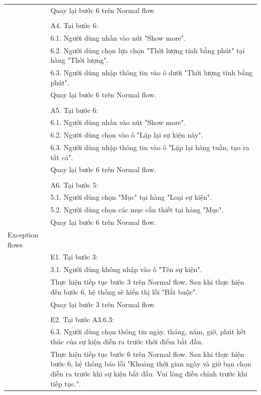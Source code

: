 \documentclass[a4paper, 12pt]{article}
\begin{document}
\begin{table}[H]
\begin{tabular}{|l|p{11cm}|}
        & Quay lại bước 6 trên Normal flow. \\
        & \\
        & A4. Tại bước 6: \\
        & 6.1. Người dùng nhấn vào nút "Show more". \\
        & 6.2. Người dùng chọn lựa chọn "Thời lượng tính bằng phút" tại hàng "Thời lượng". \\
        & 6.3. Người dùng nhập thông tin vào ô dưới "Thời lượng tính bằng phút". \\
        & Quay lại bước 6 trên Normal flow. \\
        & \\
        & A5. Tại bước 6: \\
        & 6.1. Người dùng nhấn vào nút "Show more". \\
        & 6.2. Người dùng chọn vào ô "Lặp lại sự kiện này". \\
        & 6.3. Người dùng nhập thông tin vào ô "Lặp lại hàng tuần, tạo ra tất cả". \\
        & Quay lại bước 6 trên Normal flow. \\
        & \\
        & A6. Tại bước 5: \\
        & 5.1. Người dùng chọn "Mục" tại hàng "Loại sự kiện". \\
        & 5.2. Người dùng chọn các mục cần thiết tại hàng "Mục". \\
        & Quay lại bước 6 trên Normal flow. \\
        \hline
        Exception flows & \\
        & E1. Tại bước 3: \\
        & 3.1. Người dùng không nhập vào ô "Tên sự kiện". \\
        & Thực hiện tiếp tục bước 3 trên Normal flow. Sau khi thực hiện đến bước 6, hệ thống sẽ hiển thị lỗi "Bắt buộc". \\ 
        & Quay lại bước 3 trên Normal flow. \\
        & \\
        & E2. Tại bước A3.6.3: \\
        & 6.3. Người dùng chọn thông tin ngày, tháng, năm, giờ, phút kết thúc của sự kiện diễn ra trước thời điểm bắt đầu. \\
        & Thực hiện tiếp tục bước 6 trên Normal flow. Sau khi thực hiện bước 6, hệ thống báo lỗi "Khoảng thời gian ngày và giờ bạn chọn diễn ra trước khi sự kiện bắt đầu. Vui lòng điều chỉnh trước khi tiếp tục.". \\

\end{tabular}
\end{table}
\end{document}
